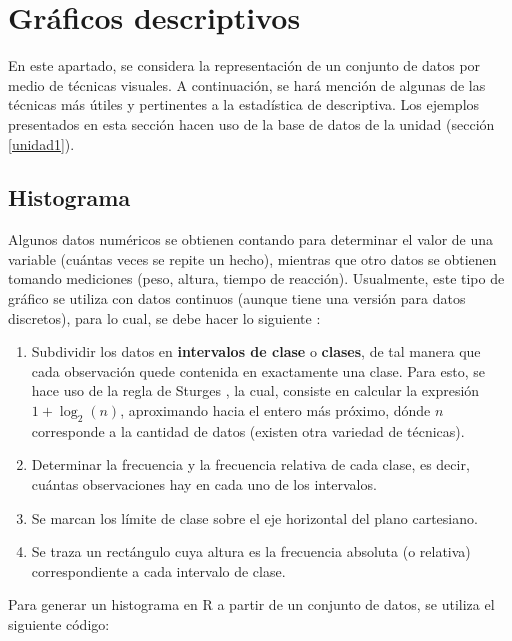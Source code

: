 \documentclass[
]{book}
\providecommand{\tightlist}{%
  \setlength{\itemsep}{0pt}\setlength{\parskip}{0pt}}
\theoremstyle{definition}
\theoremstyle{definition}
\theoremstyle{definition}
\theoremstyle{definition}
\theoremstyle{remark}
\begin{document}
\hypertarget{gruxe1ficos-descriptivos}{%
\section{Gráficos descriptivos}\label{gruxe1ficos-descriptivos}}

En este apartado, se considera la representación de un conjunto de datos por medio de técnicas visuales. A continuación, se hará mención de algunas de las técnicas más útiles y pertinentes a la estadística de descriptiva. Los ejemplos presentados en esta sección hacen uso de la base de datos de la unidad (sección \ref{unidad1}).

\hypertarget{histograma}{%
\subsection{Histograma}\label{histograma}}

Algunos datos numéricos se obtienen contando para determinar el valor de una variable (cuántas veces se repite un hecho), mientras que otro datos se obtienen tomando mediciones (peso, altura, tiempo de reacción). Usualmente, este tipo de gráfico se utiliza con datos continuos (aunque tiene una versión para datos discretos), para lo cual, se debe hacer lo siguiente \citep[página 12]{Devore}:

\begin{enumerate}
\def\labelenumi{\arabic{enumi}.}
\tightlist
\item
  Subdividir los datos en \textbf{intervalos de clase} o \textbf{clases}, de tal manera que cada observación quede contenida en exactamente una clase. Para esto, se hace uso de la regla de Sturges \citeyearpar{sturges1926choice}, la cual, consiste en calcular la expresión \(1+\log_2(n)\), aproximando hacia el entero más próximo, dónde \(n\) corresponde a la cantidad de datos (existen otra variedad de técnicas).
\item
  Determinar la frecuencia y la frecuencia relativa de cada clase, es decir, cuántas observaciones hay en cada uno de los intervalos.
\item
  Se marcan los límite de clase sobre el eje horizontal del plano cartesiano.
\item
  Se traza un rectángulo cuya altura es la frecuencia absoluta (o relativa) correspondiente a cada intervalo de clase.
\end{enumerate}

Para generar un histograma en R a partir de un conjunto de datos, se utiliza el siguiente código:
\end{document}
